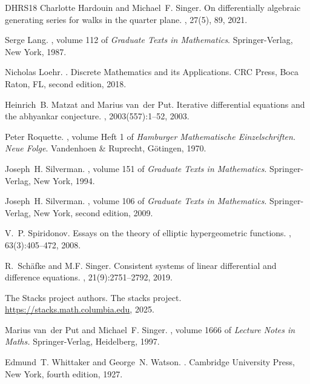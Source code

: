 \documentclass[preprint,12pt]{elsarticle}
\numberwithin{equation}{section} %
\theoremstyle{theorem}
\theoremstyle{definition}
\begin{document}
\begin{thebibliography}{DHRS18}
Charlotte Hardouin and Michael~F. Singer.
\newblock On differentially algebraic generating series for walks in the quarter plane.
, 27(5), 89, 2021.

Serge Lang.
, volume 112 of {\em Graduate {{Texts}} in {{Mathematics}}}.
\newblock Springer-Verlag, New York, 1987.

Nicholas Loehr.
.
\newblock Discrete Mathematics and its Applications. CRC Press, Boca Raton, FL, second edition, 2018.

Heinrich~B. Matzat and Marius van~der Put.
\newblock Iterative differential equations and the abhyankar conjecture.
, 2003(557):1--52, 2003.

Peter Roquette.
, volume Heft 1 of {\em Hamburger Mathematische Einzelschriften. Neue Folge}.
\newblock Vandenhoen \& Ruprecht, G\"otingen, 1970.

Joseph~H. Silverman.
, volume 151 of {\em Graduate {{Texts}} in {{Mathematics}}}.
\newblock Springer-Verlag, New York, 1994.

Joseph~H. Silverman.
, volume 106 of {\em Graduate {{Texts}} in {{Mathematics}}}.
\newblock Springer-Verlag, New York, second edition, 2009.

V.~P. Spiridonov.
\newblock Essays on the theory of elliptic hypergeometric functions.
, 63(3):405--472, 2008.

R.~Sch\"{a}fke and M.F. Singer.
\newblock Consistent systems of linear differential and difference equations.
, 21(9):2751–2792, 2019.

The {Stacks project authors}.
\newblock The stacks project.
\newblock \url{https://stacks.math.columbia.edu}, 2025.

Marius van~der Put and Michael~F. Singer.
, volume 1666 of {\em Lecture Notes in Maths.}
\newblock Springer-Verlag, Heidelberg, 1997.

Edmund~T. Whittaker and George~N. Watson.
.
\newblock Cambridge University Press, New York, fourth edition, 1927.

\end{thebibliography}
\end{document}
